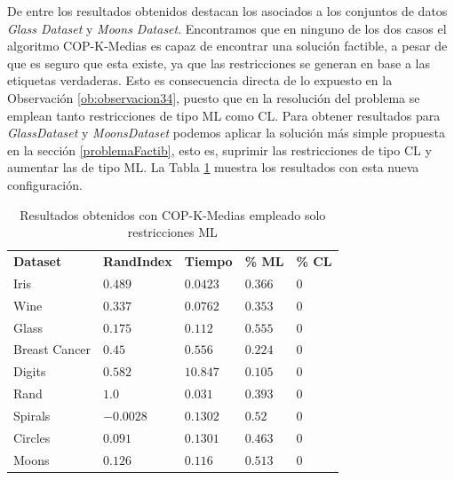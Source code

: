 De entre los resultados obtenidos destacan los asociados a los conjuntos de datos \textit{Glass Dataset} y \textit{Moons Dataset}. Encontramos que en ninguno de los dos casos el algoritmo COP-K-Medias es capaz de encontrar una solución factible, a pesar de que es seguro que esta existe, ya que las restricciones se generan en base a las etiquetas verdaderas. Esto es consecuencia directa de lo expuesto en la Observación \ref{ob:observacion34}, puesto que en la resolución del problema se emplean tanto restricciones de tipo \acs{ML} como \acs{CL}. Para obtener resultados para \textit{GlassDataset} y \textit{MoonsDataset} podemos aplicar la solución más simple propuesta en la sección \ref{problemaFactib}, esto es, suprimir las restricciones de tipo \acs{CL} y aumentar las de tipo \acs{ML}. La Tabla \ref{tab:tabla6} muestra los resultados con esta nueva configuración.

\begin{table}[!h]
	\centering
	\setlength{\arrayrulewidth}{1mm}
	\setlength{\tabcolsep}{10pt}
	\renewcommand{\arraystretch}{1}
	
	\begin{tabular}{ >{\centering\arraybackslash}m{2.5cm}  >{\centering\arraybackslash}m{1.8cm}>{\centering\arraybackslash}m{1.5cm}>{\centering\arraybackslash}m{1.2cm}>{\centering\arraybackslash}m{1.2cm}}
		\hline
		\rowcolor{black}
		\multicolumn{5}{c}{\bf \color{white}{Resultados de COP-K-Medias con restricciones ML}}\\
		\hline
		\rowcolor{gray!50}
		\textbf{Dataset} & \textbf{RandIndex} & \textbf{Tiempo} & \textbf{\% ML} & \textbf{\% CL}  \\
		Iris & $0.489$ & $0.0423$ & $0.366$ & $0$ \\
		Wine & $0.337$ & $0.0762$ & $0.353$ & $0$ \\
		Glass & $0.175$ & $0.112$ & $0.555$ & $0$ \\
		Breast Cancer & $0.45$ & $0.556$ & $0.224$ & $0$ \\
		Digits & $0.582$ & $10.847$ & $0.105$ & $0$ \\
		Rand & $1.0$ & $0.031$ & $0.393$ & $0$ \\
		Spirals & $-0.0028$ & $0.1302$ & $0.52$ & $0$ \\
		Circles & $0.091$ & $0.1301$ & $0.463$ & $0$ \\
		Moons & $0.126$ & $0.116$ & $0.513$ & $0$ \\
		\hline
		
	\end{tabular}
	\caption{Resultados obtenidos con COP-K-Medias empleado solo restricciones \acs{ML}}
	\label{tab:tabla6}
\end{table}


